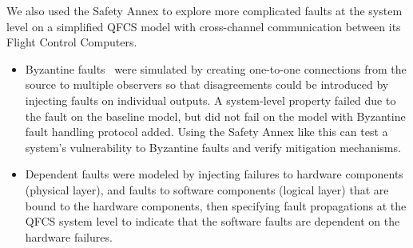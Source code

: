We also used the Safety Annex to explore more complicated faults at the system level on a simplified QFCS model with cross-channel communication between its Flight Control Computers.

\begin{itemize}
	\item Byzantine faults~\cite{Driscoll-Byzantine-Fault} were simulated by creating one-to-one connections from the source to multiple observers so that disagreements could be introduced by injecting faults on individual outputs. A system-level property failed due to the fault on the baseline model, but did not fail on the model with Byzantine fault handling protocol added. Using the Safety Annex like this can test a system's vulnerability to Byzantine faults and verify mitigation mechanisms.
	
	\item Dependent faults were modeled by injecting failures to hardware components (physical layer), and faults to software components (logical layer) that are bound to the hardware components, then specifying fault propagations at the QFCS system level to indicate that the software faults are dependent on the hardware failures.
\end{itemize}


